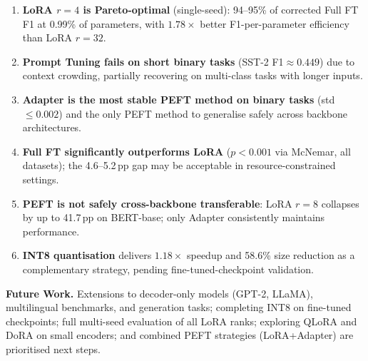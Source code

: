 \documentclass[conference]{IEEEtran}
\begin{document}
\begin{enumerate}
  \item \textbf{LoRA $r{=}4$ is Pareto-optimal} (single-seed): 94--95\% of corrected Full FT F1 at 0.99\% of parameters, with $1.78\times$ better F1-per-parameter efficiency than LoRA $r{=}32$.
  \item \textbf{Prompt Tuning fails on short binary tasks} (SST-2 F1${\approx}0.449$) due to context crowding, partially recovering on multi-class tasks with longer inputs.
  \item \textbf{Adapter is the most stable PEFT method on binary tasks} (std${\leq}0.002$) and the only PEFT method to generalise safely across backbone architectures.
  \item \textbf{Full FT significantly outperforms LoRA} ($p{<}0.001$ via McNemar, all datasets); the 4.6--5.2\,pp gap may be acceptable in resource-constrained settings.
  \item \textbf{PEFT is not safely cross-backbone transferable}: LoRA $r{=}8$ collapses by up to 41.7\,pp on BERT-base; only Adapter consistently maintains performance.
  \item \textbf{INT8 quantisation} delivers $1.18\times$ speedup and 58.6\% size reduction as a complementary strategy, pending fine-tuned-checkpoint validation.
\end{enumerate}

\textbf{Future Work.} Extensions to decoder-only models (GPT-2, LLaMA), multilingual benchmarks, and generation tasks; completing INT8 on fine-tuned checkpoints; full multi-seed evaluation of all LoRA ranks; exploring QLoRA and DoRA on small encoders; and combined PEFT strategies (LoRA+Adapter) are prioritised next steps.
\end{document}
